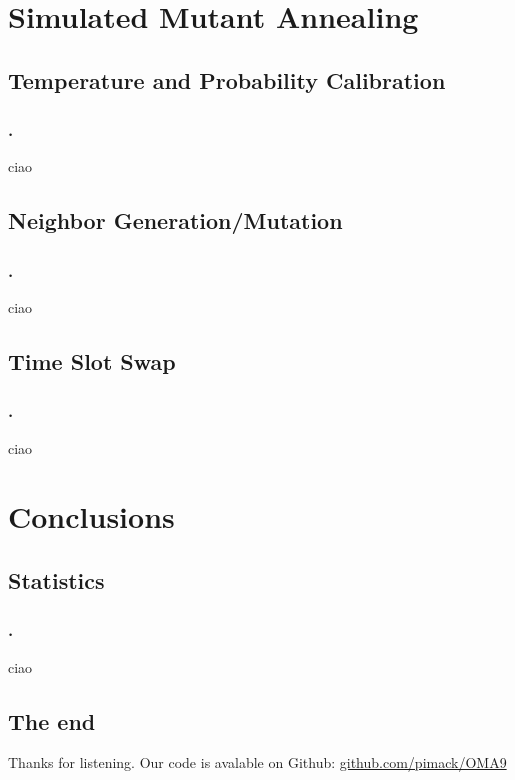\documentclass{beamer}
\begin{document}
\section{Simulated Mutant Annealing}

\subsection{Temperature and Probability Calibration}

\begin{frame}
\frametitle{\thesection.\thesubsection \ \insertsubsection}
ciao
\end{frame}

\subsection{Neighbor Generation/Mutation}

\begin{frame}
\frametitle{\thesection.\thesubsection \ \insertsubsection}
ciao
\end{frame}

\subsection{Time Slot Swap}

\begin{frame}
\frametitle{\thesection.\thesubsection \ \insertsubsection}
ciao
\end{frame}

\section{Conclusions}

\subsection{Statistics}

\begin{frame}
\frametitle{\thesection.\thesubsection \ \insertsubsection}
ciao
\end{frame}

\subsection{The end}

\begin{frame}
Thanks for listening.
\vfill
Our code is avalable on Github: \href{https://github.com/pimack/OMA9}{github.com/pimack/OMA9}
\end{frame}
\end{document}
